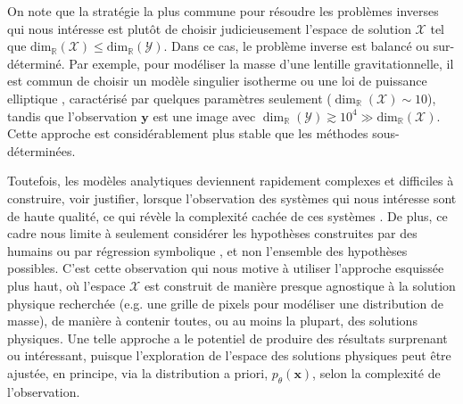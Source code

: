 On note que la stratégie la plus commune pour résoudre les problèmes inverses qui nous intéresse est plutôt de 
choisir judicieusement l'espace de solution $\mathcal{X}$ tel que $\mathrm{dim}_{\mathbb{R}}(\mathcal{X}) \leq \mathrm{dim}_{\mathbb{R}}(\mathcal{Y})$. 
Dans ce cas, le problème inverse est balancé ou sur-déterminé. 
Par exemple, pour modéliser la masse d'une lentille gravitationnelle, il est commun  
de choisir un modèle singulier isotherme ou une loi de puissance elliptique \citep[e.g.][]{Koopmans2006,Barnabe2009,Auger2010}, 
caractérisé par quelques paramètres seulement 
($\dim_{\mathbb{R}}(\mathcal{X}) \sim 10$), tandis que 
l'observation $\mathbf{y}$ est une image avec $\dim_{\mathbb{R}}(\mathcal{Y}) \gtrsim 10^{4} \gg \mathrm{dim}_{\mathbb{R}}(\mathcal{X})$. 
Cette approche est considérablement plus stable que les méthodes sous-déterminées. 

Toutefois, 
les modèles analytiques deviennent rapidement complexes et difficiles à construire, voir justifier, lorsque l'observation des systèmes qui nous intéresse
sont de haute qualité, ce qui révèle la complexité cachée de ces systèmes \citep[e.g.][]{Schuldt2019}. 
De plus, ce cadre nous limite à seulement considérer les hypothèses construites par des humains 
ou par régression symbolique \citep[e.g.][]{Lemos2022}, et non l'ensemble des hypothèses possibles.
C'est cette observation qui nous motive à utiliser l'approche esquissée plus haut, 
où l'espace $\mathcal{X}$ est construit de manière presque agnostique à la solution 
physique recherchée (e.g. une grille de pixels pour modéliser une distribution de masse), 
de manière à contenir toutes, ou au moins la plupart, des solutions physiques. Une telle approche a 
le potentiel de produire des résultats surprenant ou intéressant, puisque l'exploration de l'espace des solutions physiques 
peut être ajustée, en principe, via la distribution a priori, $p_\theta(\mathbf{x})$, selon la complexité de l'observation.

